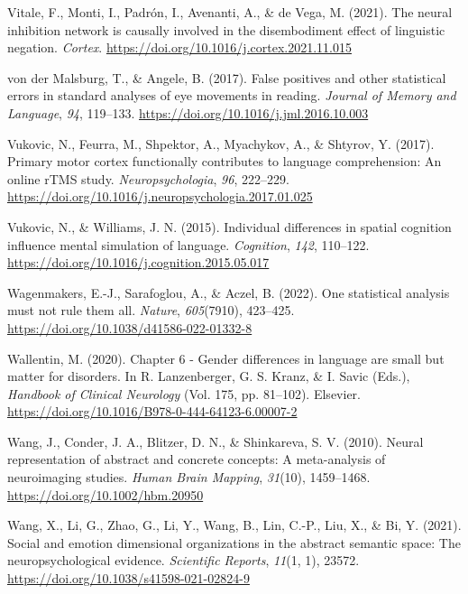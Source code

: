 \documentclass[
  12pt,
  man,floatsintext]{apa7}
\newlength{\cslhangindent}
\newlength{\cslentryspacingunit} %
\newenvironment{CSLReferences}[2] %
 {%
  \setlength{\parindent}{0pt}
  \ifodd #1
  \let\oldpar\par
  \def\par{\hangindent=\cslhangindent\oldpar}
  \fi
  \setlength{\parskip}{#2\cslentryspacingunit}
 }%
 {}
\begin{document}
\begin{CSLReferences}{1}{0}
\leavevmode{}%
Vitale, F., Monti, I., Padrón, I., Avenanti, A., \& de Vega, M. (2021). The neural inhibition network is causally involved in the disembodiment effect of linguistic negation. \emph{Cortex}. \url{https://doi.org/10.1016/j.cortex.2021.11.015}

\leavevmode{}%
von der Malsburg, T., \& Angele, B. (2017). False positives and other statistical errors in standard analyses of eye movements in reading. \emph{Journal of Memory and Language}, \emph{94}, 119--133. \url{https://doi.org/10.1016/j.jml.2016.10.003}

\leavevmode{}%
Vukovic, N., Feurra, M., Shpektor, A., Myachykov, A., \& Shtyrov, Y. (2017). Primary motor cortex functionally contributes to language comprehension: {An} online {rTMS} study. \emph{Neuropsychologia}, \emph{96}, 222--229. \url{https://doi.org/10.1016/j.neuropsychologia.2017.01.025}

\leavevmode{}%
Vukovic, N., \& Williams, J. N. (2015). Individual differences in spatial cognition influence mental simulation of language. \emph{Cognition}, \emph{142}, 110--122. \url{https://doi.org/10.1016/j.cognition.2015.05.017}

\leavevmode{}%
Wagenmakers, E.-J., Sarafoglou, A., \& Aczel, B. (2022). One statistical analysis must not rule them all. \emph{Nature}, \emph{605}(7910), 423--425. \url{https://doi.org/10.1038/d41586-022-01332-8}

\leavevmode{}%
Wallentin, M. (2020). Chapter 6 - {Gender} differences in language are small but matter for disorders. In R. Lanzenberger, G. S. Kranz, \& I. Savic (Eds.), \emph{Handbook of {Clinical Neurology}} (Vol. 175, pp. 81--102). {Elsevier}. \url{https://doi.org/10.1016/B978-0-444-64123-6.00007-2}

\leavevmode{}%
Wang, J., Conder, J. A., Blitzer, D. N., \& Shinkareva, S. V. (2010). Neural representation of abstract and concrete concepts: {A} meta-analysis of neuroimaging studies. \emph{Human Brain Mapping}, \emph{31}(10), 1459--1468. \url{https://doi.org/10.1002/hbm.20950}

\leavevmode{}%
Wang, X., Li, G., Zhao, G., Li, Y., Wang, B., Lin, C.-P., Liu, X., \& Bi, Y. (2021). Social and emotion dimensional organizations in the abstract semantic space: The neuropsychological evidence. \emph{Scientific Reports}, \emph{11}(1, 1), 23572. \url{https://doi.org/10.1038/s41598-021-02824-9}


\end{CSLReferences}
\end{document}
